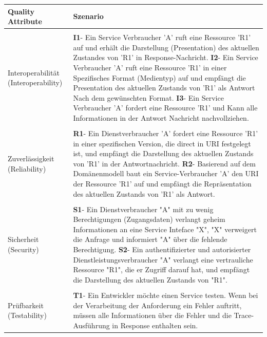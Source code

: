 \documentclass{acmsiggraph}
\begin{document}
\begin{center}
  \label{tab:xtab}
  \begin{xtabular}{|C{2cm}|L{6cm}|} 
  \hline
    Quality Attribute & Szenario \\
    \hline
    & \\[-2ex]
    Interoperabilität (Interoperability) & \textbf{I1}- Ein  Service Verbraucher 'A' ruft eine Ressource 'R1' auf und erhält die Darstellung (Presentation) des aktuellen Zustandes von 'R1' in Response-Nachricht.\newline
\textbf{I2}- Ein Service Verbraucher 'A' ruft eine Ressource 'R1' in einer
Spezifisches Format (Medientyp) auf und empfängt die
Presentation des aktuellen Zustands von 'R1' als Antwort
Nach dem gewünschten Format.\newline
\textbf{I3}- Ein Service Verbraucher 'A' fordert eine Ressource 'R1' und
Kann alle Informationen in der Antwort Nachricht nachvollziehen.
 \\ 
       \hline
       & \\[-2ex]
    Zuverlässigkeit (Reliability) & \textbf{R1}- Ein Dienstverbraucher 'A' fordert eine Ressource 'R1' in einer spezifischen Version, die direct  in URI festgelegt ist, und empfängt die Darstellung des aktuellen Zustands von 'R1' in der Antwortnachricht.\newline
\textbf{R2}- Basierend auf dem Domänenmodell baut ein Service-Verbraucher 'A' den URI der Ressource 'R1' auf und empfängt die Repräsentation des aktuellen Zustands von 'R1' als Antwort.
 \\ 
      \hline
      & \\[-2ex]
     Sicherheit  (Security) & 
     \textbf{S1}- Ein Dienstverbraucher "A" mit zu wenig Berechtigungen (Zugangsdaten) verlangt geheim Informationen an eine Service Inteface "X", "X" verweigert die Anfrage und informiert "A" über die fehlende Berechtigung. \newline
\textbf{S2}- Ein authentifizierter und autorisierter Dienstleistungsverbraucher "A" verlangt eine vertrauliche Ressource "R1", die er Zugriff darauf hat, und empfängt die Darstellung des aktuellen Zustands von "R1".
 \\ 
  \hline
      & \\[-2ex]
     Prüfbarkeit  (Testability) & 
     \textbf{T1}- Ein Entwickler möchte einen Service testen. Wenn bei der Verarbeitung der Anforderung ein Fehler auftritt, müssen alle Informationen über die Fehler und die Trace-Ausführung in Response enthalten sein. 

\end{xtabular}
\end{center}
\end{document}
